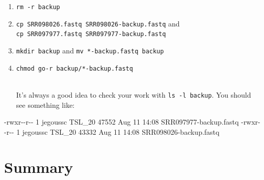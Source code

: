 \documentclass[
  letterpaper,
  DIV=11,
  numbers=noendperiod]{scrreprt}
\newenvironment{Shaded}{\begin{snugshade}}{\end{snugshade}}
\newcommand{\ExtensionTok}[1]{\textcolor[rgb]{0.00,0.23,0.31}{#1}}
\newcommand{\NormalTok}[1]{\textcolor[rgb]{0.00,0.23,0.31}{#1}}
\providecommand{\tightlist}{%
  \setlength{\itemsep}{0pt}\setlength{\parskip}{0pt}}\usepackage{longtable,booktabs,array}
\begin{document}
\begin{tcolorbox}[enhanced jigsaw, opacitybacktitle=0.6, colback=white, coltitle=black, opacityback=0, rightrule=.15mm, toptitle=1mm, toprule=.15mm, bottomtitle=1mm, colframe=quarto-callout-caution-color-frame, arc=.35mm, titlerule=0mm, colbacktitle=quarto-callout-caution-color!10!white, leftrule=.75mm, title={Solution}, breakable, bottomrule=.15mm, left=2mm]

\begin{enumerate}
\def\labelenumi{\arabic{enumi}.}
\tightlist
\item
  \texttt{rm\ -r\ backup}
\item
  \texttt{cp\ SRR098026.fastq\ SRR098026-backup.fastq} and
  \texttt{cp\ SRR097977.fastq\ SRR097977-backup.fastq}
\item
  \texttt{mkdir\ backup} and \texttt{mv\ *-backup.fastq\ backup}
\item
  \texttt{chmod\ go-r\ backup/*-backup.fastq}\strut \\
  It's always a good idea to check your work with
  \texttt{ls\ -l\ backup}. You should see something like:
\end{enumerate}

\begin{Shaded}
\begin{Highlighting}[]
\ExtensionTok{{-}rwxr{-}{-}r{-}{-}}\NormalTok{ 1 jegoussc TSL\_20 47552 Aug 11 14:08 SRR097977{-}backup.fastq}
\ExtensionTok{{-}rwxr{-}{-}r{-}{-}}\NormalTok{ 1 jegoussc TSL\_20 43332 Aug 11 14:08 SRR098026{-}backup.fastq}
\end{Highlighting}
\end{Shaded}

\end{tcolorbox}

\section{Summary}\label{summary-2}
\end{document}
